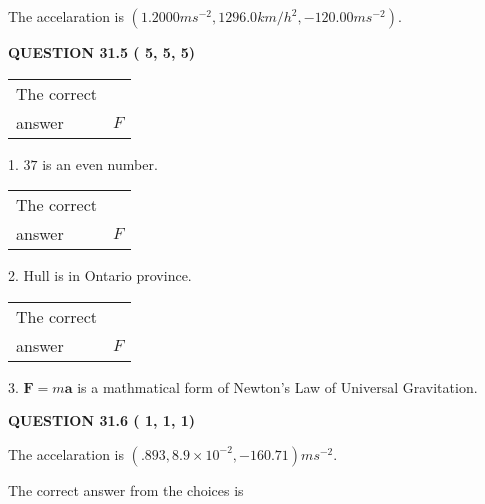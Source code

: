 \documentclass[12pt]{article}
\begin{document}
 
The accelaration is
$(
1.2000ms^{-2},
1296.0km/h^2,
-120.00ms^{-2}
).
$
 
 
 
 
  
\vspace{0.2in}
  
{\textbf{\Large{QUESTION
31.5 
 (          5,          5,          5)
}}}
  
  
 
 
\noindent{}

 
\noindent\begin{tabular}{|l|l|}\hline The correct & \\
          answer &  %
$F$ \\ \hline \end{tabular}
1. $ %
37$ is an  %
even number.
 
\noindent\begin{tabular}{|l|l|}\hline The correct & \\
          answer &  %
$F$ \\ \hline \end{tabular}
2.  %
Hull is in  %
Ontario province.
 
\noindent\begin{tabular}{|l|l|}\hline The correct & \\
          answer &  %
$F$ \\ \hline \end{tabular}
3.  %
$\mathbf{F}=m\mathbf{a}$ is a mathmatical form of  %
Newton's Law of Universal Gravitation.
 
 
 
  
\vspace{0.2in}
  
{\textbf{\Large{QUESTION
31.6 
 (          1,          1,          1)
}}}
  
  


 
 
\noindent{}
 
 
The accelaration is $  %
(
.893,
8.9 \times 10^{-2},
-160.71)
ms^{-2} $.
 
 
 
 
 
 
\noindent{}

The correct answer from the choices is
\end{document}
